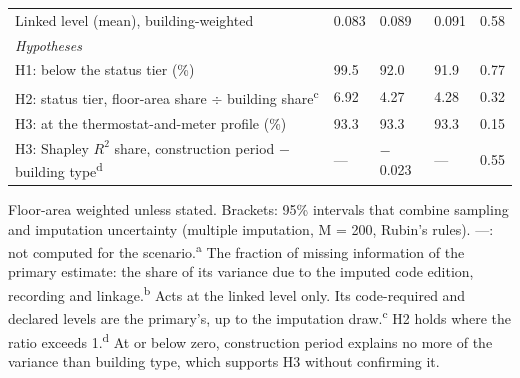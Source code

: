 \begin{table}[!htbp]
\begin{tabular}{L{3.6cm}L{2.0cm}L{2.1cm}L{2.0cm}L{2.0cm}}
Linked level (mean), building-weighted & 0.083\newline [0.075, 0.090] & 0.089\newline [0.081, 0.097] & 0.091\newline [0.082, 0.099] & 0.58 \\
\textit{Hypotheses} &  &  &  &  \\
H1: below the status tier (\%) & 99.5\newline [98.9, 99.7] & 92.0\newline [89.4, 94.1] & 91.9\newline [89.0, 94.0] & 0.77 \\
H2: status tier, floor-area share $\div$ building share\textsuperscript{c} & 6.92\newline [3.39, 14.15] & 4.27\newline [3.10, 5.89] & 4.28\newline [3.14, 5.83] & 0.32 \\
H3: at the thermostat-and-meter profile (\%) & 93.3\newline [92.0, 94.4] & 93.3\newline [92.0, 94.4] & 93.3\newline [92.0, 94.3] & 0.15 \\
H3: Shapley $R^2$ share, construction period $-$ building type\textsuperscript{d} & — & $-$0.023\newline [$-$0.045, $-$0.002] & — & 0.55 \\
\bottomrule
\end{tabular}
\par\smallskip\parbox{\textwidth}{\footnotesize Floor-area weighted unless stated. Brackets: 95\% intervals that combine sampling and imputation uncertainty (multiple imputation, M = 200, Rubin's rules). —: not computed for the scenario.\newline \textsuperscript{a} The fraction of missing information of the primary estimate: the share of its variance due to the imputed code edition, recording and linkage.\newline \textsuperscript{b} Acts at the linked level only. Its code-required and declared levels are the primary's, up to the imputation draw.\newline \textsuperscript{c} H2 holds where the ratio exceeds 1.\newline \textsuperscript{d} At or below zero, construction period explains no more of the variance than building type, which supports H3 without confirming it.}
\end{table}

